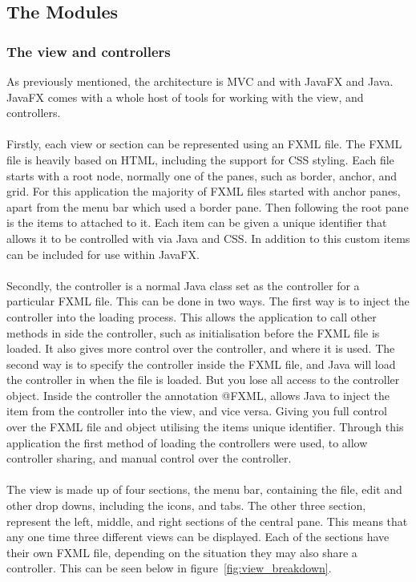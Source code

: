 \subsection{The Modules}
\label{subsec:the_modules}

\subsubsection{The view and controllers}
\label{subsubsec:imp_veiw}

As previously mentioned, the architecture is MVC and with JavaFX and Java. JavaFX comes with a whole host of tools for working with the view, and controllers. 
\\\\
Firstly, each view or section can be represented using an FXML file. The FXML file is heavily based on HTML, including the support for CSS styling. Each file starts with a root node, normally one of the panes, such as border, anchor, and grid. For this application the majority of FXML files started with anchor panes, apart from the menu bar which used a border pane. Then following the root pane is the items to attached to it. Each item can be given a unique identifier that allows it to be controlled with via Java and CSS. In addition to this custom items can be included for use within JavaFX.
\\\\
Secondly, the controller is a normal Java class set as the controller for a particular FXML file. This can be done in two ways. The first way is to inject the controller into the loading process. This allows the application to call other methods in side the controller, such as initialisation before the FXML file is loaded. It also gives more control over the controller, and where it is used. The second way is to specify the controller inside the FXML file, and Java will load the controller in when the file is loaded. But you lose all access to the controller object. Inside the controller the annotation @FXML, allows Java to inject the item from the controller into the view, and vice versa. Giving you full control over the FXML file and object utilising the items unique identifier. Through this application  the first method of loading the controllers were used, to allow controller sharing, and manual control over the controller. 
\\\\
The view is made up of four sections, the menu bar, containing the file, edit and other drop downs, including the icons, and tabs. The other three section, represent the left, middle, and right sections of the central pane. This means that any one time three different views can be displayed. Each of the sections have their own FXML file, depending on the situation they may also share a controller. This can be seen below in figure~\ref{fig:view_breakdown}.


